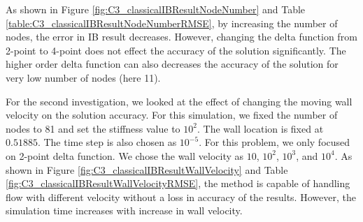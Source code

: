As shown in Figure \ref{fig:C3_classicalIBResultNodeNumber} and Table \ref{table:C3_classicalIBResultNodeNumberRMSE}, by increasing the number of nodes, the error in IB result decreases. However, changing the delta function from 2-point to 4-point does not effect the accuracy of the solution significantly. The higher order delta function can also decreases the accuracy of the solution for very low number of nodes (here 11). 

For the second investigation, we looked at the effect of changing the moving wall velocity on the solution accuracy. For this simulation, we fixed the number of nodes to 81 and set the stiffness value to $10^2$. The wall location is fixed at $0.51885$. The time step is also chosen as $10^{-5}$. For this problem, we only focused on 2-point delta function. We chose the wall velocity as $10$, $10^2$, $10^3$, and $10^4$. As shown in Figure \ref{fig:C3_classicalIBResultWallVelocity} and Table \ref{fig:C3_classicalIBResultWallVelocityRMSE}, the method is capable of handling flow with different velocity without a loss in accuracy of the results. However, the simulation time increases with increase in wall velocity.

